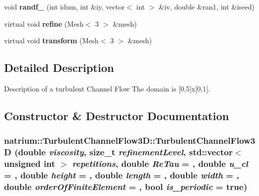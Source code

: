 \begin{DoxyCompactItemize}
\item 
\hypertarget{classnatrium_1_1TurbulentChannelFlow3D_aaa37441a5ea6a0f3e2ef534c24eabbfe}{
void {\bfseries randf\_} (int idum, int \&iy, vector$<$ int $>$ \&iv, double \&ran1, int \&iseed)}
\label{classnatrium_1_1TurbulentChannelFlow3D_aaa37441a5ea6a0f3e2ef534c24eabbfe}

\item 
\hypertarget{classnatrium_1_1TurbulentChannelFlow3D_a28a4340ffbf2044de9d99ba6b8c6c346}{
virtual void {\bfseries refine} (Mesh$<$ 3 $>$ \&mesh)}
\label{classnatrium_1_1TurbulentChannelFlow3D_a28a4340ffbf2044de9d99ba6b8c6c346}

\item 
\hypertarget{classnatrium_1_1TurbulentChannelFlow3D_a97bd4bdeeed7e5cb932b5bc9ed834d6b}{
virtual void {\bfseries transform} (Mesh$<$ 3 $>$ \&mesh)}
\label{classnatrium_1_1TurbulentChannelFlow3D_a97bd4bdeeed7e5cb932b5bc9ed834d6b}

\end{DoxyCompactItemize}


\subsection{Detailed Description}
Description of a turbulent Channel Flow The domain is \mbox{[}0,5\mbox{]}x\mbox{[}0,1\mbox{]}. 

\subsection{Constructor \& Destructor Documentation}
\hypertarget{classnatrium_1_1TurbulentChannelFlow3D_a5ffe8d8abb3209fffa0e96dc094e88fc}{
\subsubsection[{TurbulentChannelFlow3D}]{\setlength{\rightskip}{0pt plus 5cm}natrium::TurbulentChannelFlow3D::TurbulentChannelFlow3D (double {\em viscosity}, \/  size\_\-t {\em refinementLevel}, \/  std::vector$<$ unsigned int $>$ {\em repetitions}, \/  double {\em ReTau} = {}, \/  double {\em u\_\-cl} = {}, \/  double {\em height} = {}, \/  double {\em length} = {}, \/  double {\em width} = {}, \/  double {\em orderOfFiniteElement} = {}, \/  bool {\em is\_\-periodic} = {\ttfamily true})}}
\label{classnatrium_1_1TurbulentChannelFlow3D_a5ffe8d8abb3209fffa0e96dc094e88fc}


